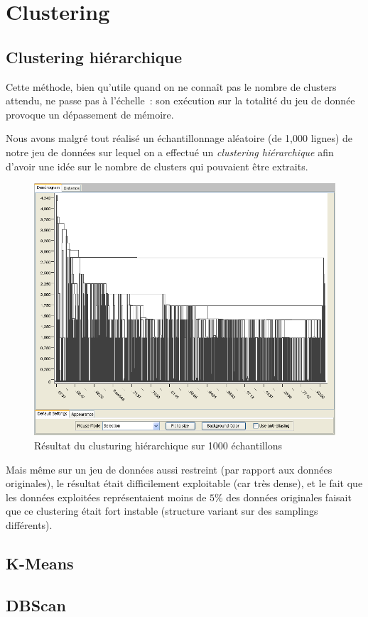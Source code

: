 \chapter{Clustering}

\section{Clustering hiérarchique}
    Cette méthode, bien qu'utile quand on ne connaît pas le nombre de clusters
    attendu, ne passe pas à l'échelle~: son exécution sur la totalité du jeu de
    donnée provoque un dépassement de mémoire.

    Nous avons malgré tout réalisé un échantillonnage aléatoire (de 1,000 lignes)
    de notre jeu de données sur lequel on a effectué un \textit{clustering hiérarchique}
    afin d'avoir une idée sur le nombre de clusters qui pouvaient être extraits.

    \begin{figure}[h]
        \centering
        \includegraphics[scale=0.35]{../screenshots/hierarchical_clustering_1000_samples.png}
        \caption{R\'esultat du clusturing hiérarchique sur 1000 \'echantillons}
        \label{diagram:hierarchical_clustering_1000_samples}
    \end{figure}

    Mais même sur un jeu de données aussi restreint (par rapport aux données
    originales), le résultat était difficilement exploitable (car très dense),
    et le fait que les données exploitées représentaient moins de $5\%$ des
    données originales faisait que ce clustering était fort instable (structure
    variant sur des samplings différents).

\section{K-Means}


\section{DBScan}
